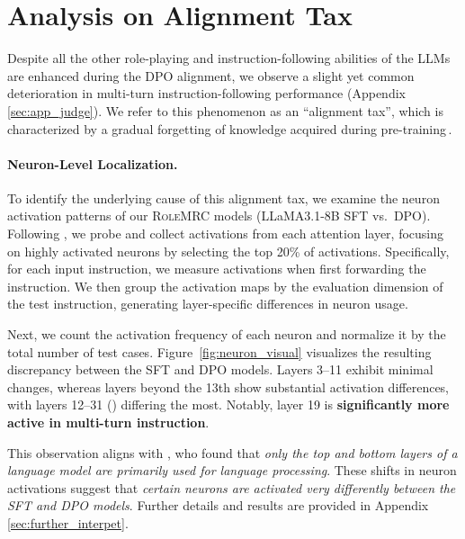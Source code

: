 \section{Analysis on Alignment Tax}
\label{sec:alignment_tax}

Despite all the other role-playing and instruction-following abilities of the LLMs are enhanced during the DPO alignment, we observe a slight yet common deterioration in multi-turn instruction-following performance (Appendix\,\ref{sec:app_judge}). We refer to this phenomenon as an ``alignment tax'', which is characterized by a gradual forgetting of knowledge acquired during pre-training\,\cite{ouyang2022training}.

\paragraph{Neuron-Level Localization.}
To identify the underlying cause of this alignment tax, we examine the neuron activation patterns of our \textsc{RoleMRC} models (LLaMA3.1-8B SFT vs.\ DPO). Following \citet{tang-etal-2024-language}, we probe and collect activations from each  attention layer, focusing on highly activated neurons by selecting the top 20\% of activations. Specifically, for each input instruction, we measure activations when first forwarding the instruction. We then group the activation maps by the evaluation dimension of the test instruction, generating layer-specific differences in neuron usage.

Next, we count the activation frequency of each neuron and normalize it by the total number of test cases. Figure~\ref{fig:neuron_visual} visualizes the resulting discrepancy between the SFT and DPO models. Layers 3–11 exhibit minimal changes, whereas layers beyond the 13th show substantial activation differences, with layers 12–31 ({\color{salmon}{highlighted in red}}) differing the most. Notably, layer 19 is \textbf{significantly more active in multi-turn instruction}.

This observation aligns with \citet{tang-etal-2024-language}, who found that \emph{only the top and bottom layers of a language model are primarily used for language processing}. These shifts in neuron activations suggest that \emph{certain neurons are activated very differently between the SFT and DPO models}. Further details and results are provided in Appendix\,\ref{sec:further_interpet}.

